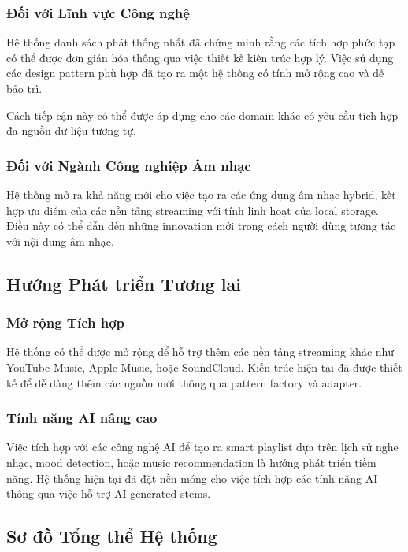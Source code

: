 \documentclass[12pt,a4paper]{article}
\begin{document}
\subsubsection{Đối với Lĩnh vực Công nghệ}

Hệ thống danh sách phát thống nhất đã chứng minh rằng các tích hợp phức tạp có thể được đơn giản hóa thông qua việc thiết kế kiến trúc hợp lý. Việc sử dụng các design pattern phù hợp đã tạo ra một hệ thống có tính mở rộng cao và dễ bảo trì.

Cách tiếp cận này có thể được áp dụng cho các domain khác có yêu cầu tích hợp đa nguồn dữ liệu tương tự.

\subsubsection{Đối với Ngành Công nghiệp Âm nhạc}

Hệ thống mở ra khả năng mới cho việc tạo ra các ứng dụng âm nhạc hybrid, kết hợp ưu điểm của các nền tảng streaming với tính linh hoạt của local storage. Điều này có thể dẫn đến những innovation mới trong cách người dùng tương tác với nội dung âm nhạc.

\subsection{Hướng Phát triển Tương lai}

\subsubsection{Mở rộng Tích hợp}

Hệ thống có thể được mở rộng để hỗ trợ thêm các nền tảng streaming khác như YouTube Music, Apple Music, hoặc SoundCloud. Kiến trúc hiện tại đã được thiết kế để dễ dàng thêm các nguồn mới thông qua pattern factory và adapter.

\subsubsection{Tính năng AI nâng cao}

Việc tích hợp với các công nghệ AI để tạo ra smart playlist dựa trên lịch sử nghe nhạc, mood detection, hoặc music recommendation là hướng phát triển tiềm năng. Hệ thống hiện tại đã đặt nền móng cho việc tích hợp các tính năng AI thông qua việc hỗ trợ AI-generated stems.

\subsection{Sơ đồ Tổng thể Hệ thống}
\end{document}
